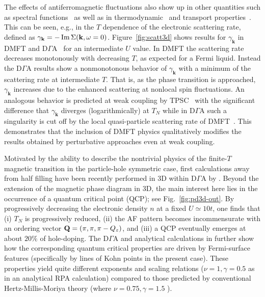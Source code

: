 \documentclass[rmp,aps,reprint,amsmath,amssymb,superscriptaddress,showpacs,nofootinbib]{revtex4-1}
\def \Im {\mathop {\rm Im}}
\newcommand{\kv}{\ensuremath{\mathbf{k}}}
\begin{document}
The effects of antiferromagnetic fluctuations also show up in other quantities such as spectral functions~\cite{Katanin2009,Rohringer2011,Fuchs2011a,Rohringer2016} as well as in thermodynamic~\cite{Rohringer2016} and  transport properties~\cite{Gull2011}. This can be seen, e.g., in the $T$ dependence of the electronic scattering rate, defined as $\gamma_{\kv}=-\Im\Sigma(\kv,\omega=0)$. Figure~\ref{fig:scatt3d} shows results for $\gamma_{\kv}$ in DMFT and D$\Gamma$A~\cite{Rohringer2016} for an intermediate $U$ value. In DMFT the scattering rate decreases monotonously with decreasing $T$, as expected for a Fermi liquid. Instead the D$\Gamma$A results show a nonmonotonous behavior of $\gamma_{\mathbf{k}}$ with a minimum of the scattering rate at intermediate $T$. That is, as the phase transition is approached, $\gamma_{\mathbf{k}}$ increases due to the enhanced scattering at nonlocal spin fluctuations. An analogous behavior is predicted at weak coupling by TPSC~\cite{Vilk1997} with the significant difference that $\gamma_{\mathbf{k}}$ diverges (logarithmically) at $T_N$ while in D$\Gamma$A such a singularity is cut off by the local quasi-particle scattering rate of DMFT~\cite{Rohringer2016}. This demonstrates that the inclusion of DMFT physics qualitatively modifies the results obtained by perturbative approaches even at weak coupling.

Motivated by the ability to describe the nontrivial physics of the finite-$T$ magnetic transition in the particle-hole symmetric case,  first calculations away from half filling have been recently performed in 3D within D$\Gamma$A by . Beyond the extension of the magnetic phase diagram in 3D, the main interest here lies in the occurrence of a quantum critical point (QCP); see Fig.~\ref{fig:pd3d-out}. By progressively decreasing the electronic density $n$ at a fixed $U \simeq 10 t$, one finds that (i) $T_N$ is progressively reduced, (ii) the AF pattern becomes incommensurate with an ordering vector ${\bf Q}= (\pi,\pi,\pi-Q_z)$, and (iii) a QCP eventually emerges at about $20\%$ of hole-doping. The D$\Gamma$A and analytical calculations in  further show how the corresponding quantum critical properties are driven by Fermi-surface features (specifically by lines of Kohn points in the present case). These properties yield  quite different exponents and scaling relations ($\nu=1,\gamma=0.5$ as in an analytical RPA calculation) compared to those predicted by conventional Hertz-Millis-Moriya theory (where $\nu=0.75,\gamma=1.5$ ).
\end{document}
